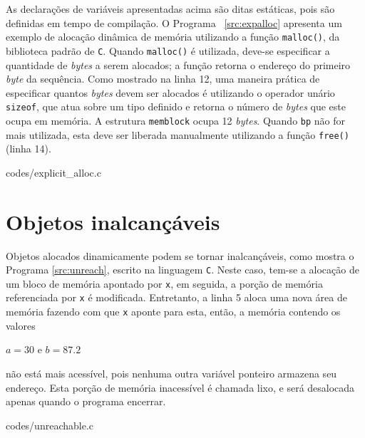\documentclass[ccc, pg2]{esinucpel}
\begin{document}
As declarações de variáveis apresentadas acima são ditas estáticas, pois são definidas em tempo de compilação. O Programa ~\ref{src:expalloc} apresenta um exemplo de alocação dinâmica de memória utilizando a função \texttt{malloc()}, da biblioteca padrão de \texttt{C}. Quando \texttt{malloc()} é utilizada, deve-se especificar a quantidade de \textit{bytes} a serem alocados; a função retorna o endereço do primeiro \textit{byte} da sequência. Como mostrado na linha 12, uma maneira prática de especificar quantos \textit{bytes} devem ser alocados é utilizando o operador unário \texttt{sizeof}, que atua sobre um tipo definido e retorna o número de \textit{bytes} que este ocupa em memória. A estrutura {\tt memblock} ocupa 12 \textit{bytes}. Quando {\tt bp} não for mais utilizada, esta deve ser liberada manualmente utilizando a função {\tt free()} (linha 14).


								 {codes/explicit_alloc.c}


\section{Objetos inalcançáveis} \label{sec:unreach}
Objetos alocados dinamicamente podem se tornar inalcançáveis, como mostra o Programa \ref{src:unreach}, escrito na linguagem \texttt{C}. Neste caso, tem-se a alocação de um bloco de memória apontado por \texttt{x}, em seguida, a porção de memória referenciada por \texttt{x} é modificada. Entretanto, a linha 5 aloca uma nova área de memória fazendo com que \texttt{x} aponte para esta, então, a memória contendo os valores
\begin{center} $a=30$ e $b=87.2$ \end{center}
não está mais acessível, pois nenhuma outra variável ponteiro armazena seu endereço. Esta porção de memória inacessível é chamada lixo, e será desalocada apenas quando o programa encerrar.


								 {codes/unreachable.c}


\end{document}
